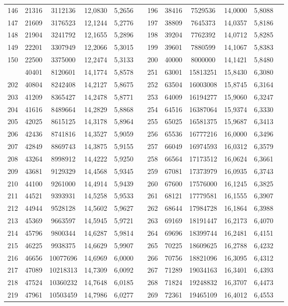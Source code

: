 \begin{longtable}{p{.17\linewidth}*{11}{S}}
146&21316&3112136&12,0830&5,2656&&196&38416&7529536&14,0000&5,8088\\
147&21609&3176523&12,1244&5,2776&&197&38809&7645373&14,0357&5,8186\\
148&21904&3241792&12,1655&5,2896&&198&39204&7762392&14,0712&5,8285\\
149&22201&3307949&12,2066&5,3015&&199&39601&7880599&14,1067&5,8383\\
150&22500&3375000&12,2474&5,3133&&200&40000&8000000&14,1421&5,8480\\
&40401&8120601&14,1774&5,8578&&251&63001&15813251&15,8430&6,3080\\
202&40804&8242408&14,2127&5,8675&&252&63504&16003008&15,8745&6,3164\\
203&41209&8365427&14,2478&5,8771&&253&64009&16194277&15,9060&6,3247\\
204&41616&8489664&14,2829&5,8868&&254&64516&16387064&15,9374&6,3330\\
205&42025&8615125&14,3178&5,8964&&255&65025&16581375&15,9687&6,3413\\
206&42436&8741816&14,3527&5,9059&&256&65536&16777216&16,0000&6,3496\\
207&42849&8869743&14,3875&5,9155&&257&66049&16974593&16,0312&6,3579\\
208&43264&8998912&14,4222&5,9250&&258&66564&17173512&16,0624&6,3661\\
209&43681&9129329&14,4568&5,9345&&259&67081&17373979&16,0935&6,3743\\
210&44100&9261000&14,4914&5,9439&&260&67600&17576000&16,1245&6,3825\\
211&44521&9393931&14,5258&5,9533&&261&68121&17779581&16,1555&6,3907\\
212&44944&9528128&14,5602&5,9627&&262&68644&17984728&16,1864&6,3988\\
213&45369&9663597&14,5945&5,9721&&263&69169&18191447&16,2173&6,4070\\
214&45796&9800344&14,6287&5,9814&&264&69696&18399744&16,2481&6,4151\\
215&46225&9938375&14,6629&5,9907&&265&70225&18609625&16,2788&6,4232\\
216&46656&10077696&14,6969&6,0000&&266&70756&18821096&16,3095&6,4312\\
217&47089&10218313&14,7309&6,0092&&267&71289&19034163&16,3401&6,4393\\
218&47524&10360232&14,7648&6,0185&&268&71824&19248832&16,3707&6,4473\\
219&47961&10503459&14,7986&6,0277&&269&72361&19465109&16,4012&6,4553\\

\end{longtable}
